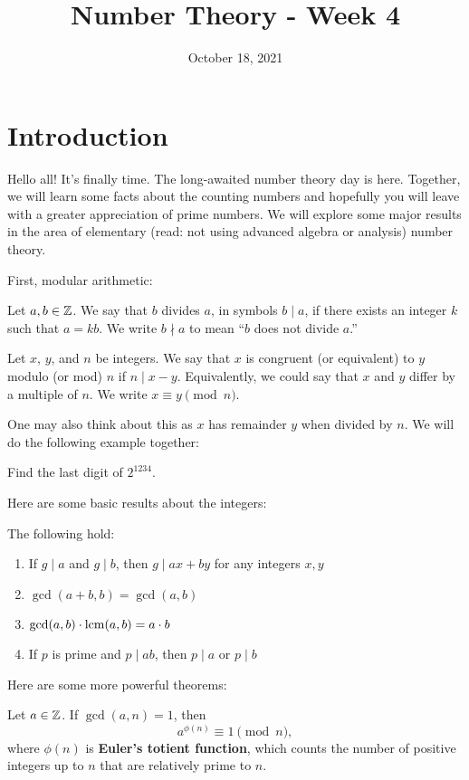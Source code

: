 \documentclass{article}
\title{Number Theory - Week 4}
\author{}
\date{October 18, 2021}
\begin{document}
\section{Introduction}

Hello all!
It's finally time.
The long-awaited number theory day is here.
Together, we will learn some facts about the counting numbers and hopefully you will leave with a greater appreciation of prime numbers.
We will explore some major results in the area of elementary (read: not using advanced algebra or analysis) number theory.

First, modular arithmetic:

\begin{definition}
    Let \(a,b\in\mathbb{Z}\). 
    We say that $b$ divides $a$, in symbols $b \mid a$, if there exists an integer $k$ such that $a=kb$. We write $b\nmid a$ to mean ``$b$ does not divide $a$.''
\end{definition}
\begin{definition}
    Let \(x\), \(y\), and \(n\) be integers. 
    We say that \(x\) is congruent (or equivalent) to \(y\) modulo (or mod) \(n\) if \(n\mid x-y\).
    Equivalently, we could say that \(x\) and \(y\) differ by a multiple of \(n\). 
    We write \(x\equiv y\pmod{n}\).
\end{definition}
One may also think about this as \(x\) has remainder \(y\) when divided by \(n\).
We will do the following example together:

\begin{example}
    Find the last digit of \(2^{1234}\).
\end{example}

Here are some basic results about the integers:

\begin{theorem}
    The following hold:
    \begin{enumerate}
        \item If \(g\mid a\) and \(g\mid b\), then \(g\mid ax+by\) for any integers \(x,y\)
        \item \(\gcd(a+b,b)=\gcd(a,b)\)
        \item \(\gcd(a,b)\cdot\operatorname{lcm}(a,b)=a\cdot b\)
        \item If \(p\) is prime and \(p\mid ab\), then \(p\mid a\) or \(p\mid b\)
    \end{enumerate}
\end{theorem}

Here are some more powerful theorems:

\begin{theorem}
    Let \(a\in\mathbb{Z}\).
    If \(\gcd(a,n)=1\), then 
    \[a^{\phi(n)}\equiv 1\pmod n,\]
    where \(\phi(n)\) is \textbf{Euler's totient function}, which counts the number of positive integers up to \(n\) that are relatively prime to \(n\).
\end{theorem}
\end{document}
